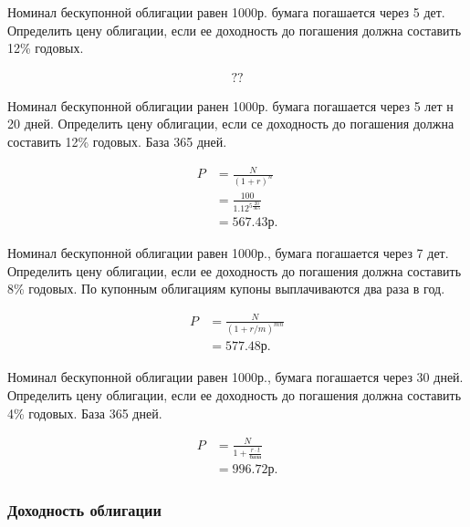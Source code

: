 \documentclass[12pt, table, a4paper,twoside]{exam}
\begin{document}
\begin{questions}
\question[10] Номинал бескупонной облигации равен 1000р. бумага погашается через 5 дет. Определить цену облигации, если ее доходность до погашения должна составить 12\% годовых.

\begin{solution}[12em]
	\begin{align}
	??
	\end{align}
\end{solution}


\question[10] Номинал бескупонной облигации ранен 1000р. бумага погашается через 5 лет н 20 дней. Определить цену облигации, если се доходность до погашения должна составить 12\% годовых. База 365 дней.

\begin{solution}[12em]
	\begin{align}
	P&=\frac{N}{(1+r)^n}\\
	&=\frac{100}{1.12^{5\frac{20}{365}}}\nonumber\\
	&=567.43\text{р.}\nonumber
	\end{align}
\end{solution}


\question[10] Номинал бескупонной облигации равен 1000р., бумага погашается через 7 дет. Определить цену облигации, если ее доходность до погашения должна составить 8\% годовых. По купонным облигациям купоны выплачиваются два раза в год.

\begin{solution}[12em]
	\begin{align}
	P&=\frac{N}{(1+r/m)^{mn}}\\
	&=577.48\text{р.}\nonumber
	\end{align}
\end{solution}

\question[10] Номинал бескупонной облигации равен 1000р., бумага погашается через 30 дней. Определить цену облигации, если ее доходность до погашения должна составить 4\% годовых. База 365 дней.

\begin{solution}[12em]
	\begin{align}
	P&=\frac{N}{1+ \frac{r \cdot t }{\text{база}}}\\
	&=996.72\text{р.}\nonumber
	\end{align}
\end{solution}

\subsubsection{Доходность облигации}


\end{questions}
\end{document}
